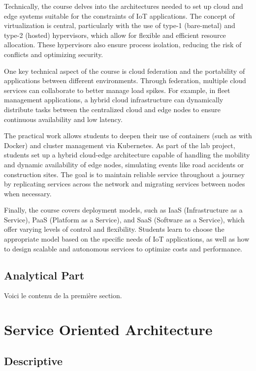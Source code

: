 Technically, the course delves into the architectures needed to set up cloud and edge systems suitable for the constraints of IoT applications. The concept of virtualization is central, particularly with the use of type-1 (bare-metal) and type-2 (hosted) hypervisors, which allow for flexible and efficient resource allocation. These hypervisors also ensure process isolation, reducing the risk of conflicts and optimizing security.

One key technical aspect of the course is cloud federation and the portability of applications between different environments. Through federation, multiple cloud services can collaborate to better manage load spikes. For example, in fleet management applications, a hybrid cloud infrastructure can dynamically distribute tasks between the centralized cloud and edge nodes to ensure continuous availability and low latency.

The practical work allows students to deepen their use of containers (such as with Docker) and cluster management via Kubernetes. As part of the lab project, students set up a hybrid cloud-edge architecture capable of handling the mobility and dynamic availability of edge nodes, simulating events like road accidents or construction sites. The goal is to maintain reliable service throughout a journey by replicating services across the network and migrating services between nodes when necessary.

Finally, the course covers deployment models, such as IaaS (Infrastructure as a Service), PaaS (Platform as a Service), and SaaS (Software as a Service), which offer varying levels of control and flexibility. Students learn to choose the appropriate model based on the specific needs of IoT applications, as well as how to design scalable and autonomous services to optimize costs and performance.

\subsection{Analytical Part}
Voici le contenu de la première section.

\section{Service Oriented Architecture}

\subsection{Descriptive}
